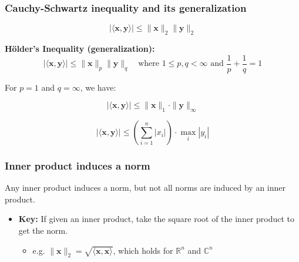 \subsubsection{Cauchy-Schwartz inequality and its generalization}
\begin{definition}
        \begin{equation}
            | \langle \mathbf{x}, \mathbf{y} \rangle | \leq \|\mathbf{x}\|_2 \|\mathbf{y}\|_2    
        \end{equation}
        \vspace{1em}

        \textbf{Hölder's Inequality (generalization):}
        \begin{equation}
            | \langle \mathbf{x}, \mathbf{y} \rangle | \leq \|\mathbf{x}\|_p \|\mathbf{y}\|_q \quad \text{where } 1 \leq p, q < \infty \text{ and } \frac{1}{p} + \frac{1}{q} = 1
        \end{equation}
\end{definition}

\begin{example}
    For \( p = 1 \) and \( q = \infty \), we have:

    \[
    | \langle \mathbf{x}, \mathbf{y} \rangle | \leq \|\mathbf{x}\|_1 \cdot \|\mathbf{y}\|_\infty
    \]

    \[
    | \langle \mathbf{x}, \mathbf{y} \rangle | \leq \left( \sum_{i=1}^{n} |x_i| \right) \cdot \max_i |y_i|
    \]
\end{example}

\subsubsection{Inner product induces a norm}
\begin{definition}
    Any inner product induces a norm, but not all norms are induced by an inner product.
    \begin{itemize}
        \item \textbf{Key:} If given an inner product, take the square root of the inner product to get the norm.
        \begin{itemize}
            \item e.g. $\lVert \mathbf{x} \rVert_2 = \sqrt{\langle \mathbf{x}, \mathbf{x} \rangle}$, which holds for $\mathbb{R}^n$ and $\mathbb{C}^n$
        \end{itemize}
    \end{itemize}
\end{definition}


